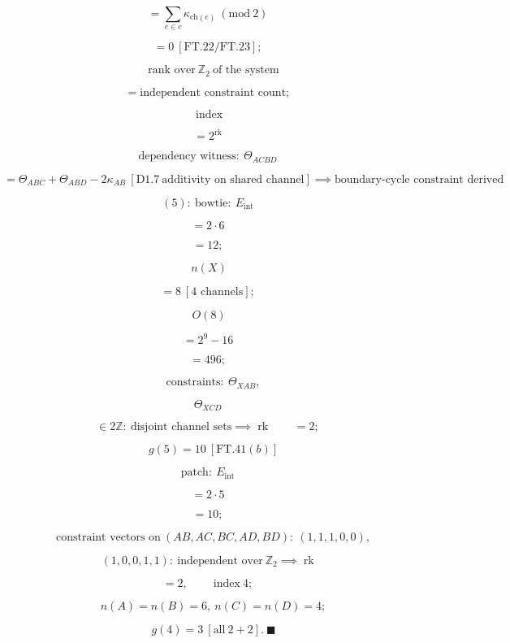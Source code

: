 \begin{theorem}
\[
= \sum_{e\in c}\kappa_{\mathrm{ch}(e)}\ (\mathrm{mod}\ 2)
\]

\[
= 0\ [\mathrm{FT.22}/\mathrm{FT.23}];
\]

\[
\quad\text{rank over}\ \mathbb Z_2\ \text{of the system}
\]

\[
= \text{independent constraint count};
\]

\[
\ \text{index}
\]

\[
= 2^{\operatorname{rk}}
\]

\[
\text{dependency witness}:\ \Theta_{ACBD}
\]

\[
= \Theta_{ABC}+\Theta_{ABD}-2\kappa_{AB}\ [\mathrm{D1.7}\ \text{additivity on shared channel}]\implies\text{boundary-cycle constraint derived}
\]

\[
(5):\ \text{bowtie}:\ E_{\mathrm{int}}
\]

\[
= 2\cdot6
\]

\[
= 12;
\]

\[
\ n(X)
\]

\[
= 8\ [\text{4 channels}];
\]

\[
\ O(8)
\]

\[
= 2^9-16
\]

\[
= 496;
\]

\[
\quad\text{constraints}:\ \Theta_{XAB},
\]

\[
\Theta_{XCD}
\]

\[
\in 2\mathbb Z:\ \text{disjoint channel sets}\implies\operatorname{rk}\qquad = 2;
\]

\[
\quad g(5)=10\ [\mathrm{FT.41}(b)]
\]

\[
\text{patch}:\ E_{\mathrm{int}}
\]

\[
= 2\cdot5
\]

\[
= 10;
\]

\[
\quad\text{constraint vectors on}\ (AB,AC,BC,AD,BD):\ (1,1,1,0,0),
\]

\[
\ (1,0,0,1,1):\ \text{independent over}\ \mathbb Z_2\implies\operatorname{rk}
\]

\[
= 2,\qquad \ \text{index}\ 4;
\]

\[
\quad n(A)=n(B)=6,\ n(C)=n(D)=4;
\]

\[
\quad g(4)=3\ [\text{all}\ 2{+}2].\ \blacksquare
\]


\end{theorem}

